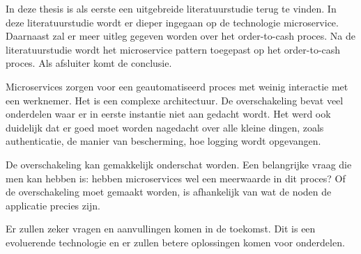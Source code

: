 In deze thesis is als eerste een uitgebreide literatuurstudie terug te vinden. In deze literatuurstudie wordt er dieper ingegaan op de technologie microservice. Daarnaast zal er meer uitleg gegeven worden over het order-to-cash proces.
Na de literatuurstudie wordt het microservice pattern toegepast op het order-to-cash proces. Als afsluiter komt de conclusie.

Microservices zorgen voor een geautomatiseerd proces met weinig interactie met een werknemer. Het is een complexe architectuur. De overschakeling bevat veel onderdelen waar er in eerste instantie niet aan gedacht wordt. Het werd ook duidelijk dat er goed moet worden nagedacht over alle kleine dingen, zoals authenticatie, de manier van bescherming, hoe logging wordt opgevangen. 

De overschakeling kan gemakkelijk onderschat worden.
Een belangrijke vraag die men kan hebben is: hebben microservices wel een meerwaarde in dit proces? Of de overschakeling moet gemaakt worden, is afhankelijk van wat de noden de applicatie precies zijn.

Er zullen zeker vragen en aanvullingen komen in de toekomst. Dit is een evoluerende technologie en er zullen betere oplossingen komen voor onderdelen.